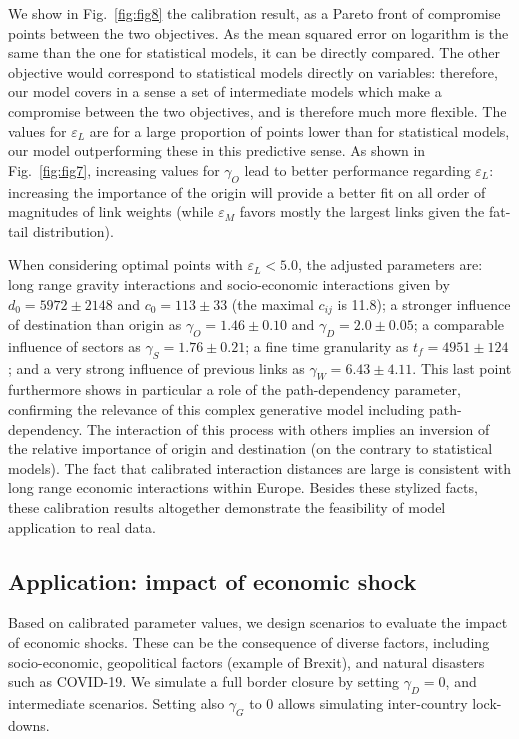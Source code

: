 \documentclass[10pt,letterpaper]{article}
\begin{document}
We show in Fig.~\ref{fig:fig8} the calibration result, as a Pareto front of compromise points between the two objectives. As the mean squared error on logarithm is the same than the one for statistical models, it can be directly compared. The other objective would correspond to statistical models directly on variables: therefore, our model covers in a sense a set of intermediate models which make a compromise between the two objectives, and is therefore much more flexible. The values for $\varepsilon_L$ are for a large proportion of points lower than for statistical models, our model outperforming these in this predictive sense. As shown in Fig.~\ref{fig:fig7}, increasing values for $\gamma_O$ lead to better performance regarding $\varepsilon_L$: increasing the importance of the origin will provide a better fit on all order of magnitudes of link weights (while $\varepsilon_M$ favors mostly the largest links given the fat-tail distribution).

When considering optimal points with $\varepsilon_L < 5.0$, the adjusted parameters are: long range gravity interactions and socio-economic interactions given by $d_0 = 5972 \pm 2148$ and $c_0 = 113 \pm 33$ (the maximal $c_{ij}$ is 11.8); a stronger influence of destination than origin as $\gamma_O = 1.46 \pm 0.10$ and $\gamma_D = 2.0 \pm 0.05$; a comparable influence of sectors as $\gamma_S = 1.76 \pm 0.21$; a fine time granularity as $t_f = 4951 \pm 124$; and a very strong influence of previous links as $\gamma_W = 6.43 \pm 4.11$. This last point furthermore shows in particular a role of the path-dependency parameter, confirming the relevance of this complex generative model including path-dependency. The interaction of this process with others implies an inversion of the relative importance of origin and destination (on the contrary to statistical models). The fact that calibrated interaction distances are large is consistent with long range economic interactions within Europe. Besides these stylized facts, these calibration results altogether demonstrate the feasibility of model application to real data.

\subsection*{Application: impact of economic shock}

Based on calibrated parameter values, we design scenarios to evaluate the impact of economic shocks. These can be the consequence of diverse factors, including socio-economic, geopolitical factors (example of Brexit), and natural disasters such as COVID-19. We simulate a full border closure by setting $\gamma_D = 0$, and intermediate scenarios. Setting also $\gamma_G$ to 0 allows simulating inter-country lock-downs.
\end{document}
